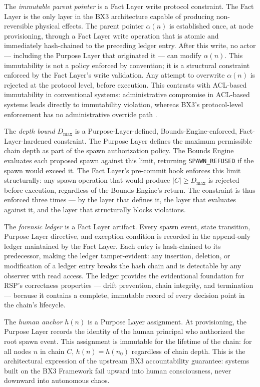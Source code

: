The \emph{immutable parent pointer} is a Fact Layer write protocol constraint. The Fact Layer is the only layer in the BX3 architecture capable of producing non-reversible physical effects. The parent pointer $\alpha(n)$ is established once, at node provisioning, through a Fact Layer write operation that is atomic and immediately hash-chained to the preceding ledger entry. After this write, no actor --- including the Purpose Layer that originated it --- can modify $\alpha(n)$. This immutability is not a policy enforced by convention; it is a structural constraint enforced by the Fact Layer's write validation. Any attempt to overwrite $\alpha(n)$ is rejected at the protocol level, before execution. This contrasts with ACL-based immutability in conventional systems: administrative compromise in ACL-based systems leads directly to immutability violation, whereas BX3's protocol-level enforcement has no administrative override path \cite{bx3-framework}.

The \emph{depth bound} $D_{\max}$ is a Purpose-Layer-defined, Bounds-Engine-enforced, Fact-Layer-hardened constraint. The Purpose Layer defines the maximum permissible chain depth as part of the spawn authorization policy. The Bounds Engine evaluates each proposed spawn against this limit, returning \texttt{SPAWN\_REFUSED} if the spawn would exceed it. The Fact Layer's pre-commit hook enforces this limit structurally: any spawn operation that would produce $|C| \geq D_{\max}$ is rejected before execution, regardless of the Bounds Engine's return. The constraint is thus enforced three times --- by the layer that defines it, the layer that evaluates against it, and the layer that structurally blocks violations.

The \emph{forensic ledger} is a Fact Layer artifact. Every spawn event, state transition, Purpose Layer directive, and exception condition is recorded in the append-only ledger maintained by the Fact Layer. Each entry is hash-chained to its predecessor, making the ledger tamper-evident: any insertion, deletion, or modification of a ledger entry breaks the hash chain and is detectable by any observer with read access. The ledger provides the evidentional foundation for RSP's correctness properties --- drift prevention, chain integrity, and termination --- because it contains a complete, immutable record of every decision point in the chain's lifecycle.

The \emph{human anchor} $h(n)$ is a Purpose Layer assignment. At provisioning, the Purpose Layer records the identity of the human principal who authorized the root spawn event. This assignment is immutable for the lifetime of the chain: for all nodes $n$ in chain $C$, $h(n) = h(n_0)$ regardless of chain depth. This is the architectural expression of the upstream BX3 accountability guarantee: systems built on the BX3 Framework fail upward into human consciousness, never downward into autonomous chaos.

